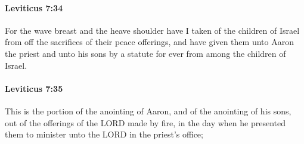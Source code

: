 		\paragraph{Leviticus 7:34} %
			\label{LEVITICUS-7-34}

			For the wave breast and the heave shoulder have I taken of the children of Israel from off the sacrifices of their peace offerings, and have given them unto Aaron the priest and unto his sons by a statute for ever from among the children of Israel.


		\paragraph{Leviticus 7:35} %
			\label{LEVITICUS-7-35}

			This is the portion of the anointing of Aaron, and of the anointing of his sons, out of the offerings of the LORD made by fire, in the day when he presented them to minister unto the LORD in the priest’s office;

